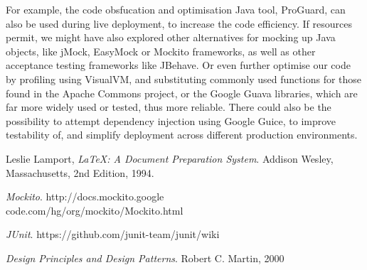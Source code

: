 \documentclass[11pt,twocolumn]{article} %
\begin{document}
For example, the code obsfucation and optimisation Java tool, ProGuard, can also be used
during live deployment, to increase the code efficiency. If resources permit, we might have
also explored other alternatives for mocking up Java objects, like jMock, EasyMock or
Mockito frameworks, as well as other acceptance testing frameworks like JBehave.
Or even further optimise our code by profiling using VisualVM, and substituting commonly
used functions for those found in the Apache Commons project, or the Google Guava
libraries, which are far more widely used or tested, thus more reliable. There could also be
the possibility to attempt dependency injection using Google Guice, to improve testability
of, and simplify deployment across different production environments.


\begin{thebibliography}{9}

  Leslie Lamport,
  \emph{\LaTeX: A Document Preparation System}.
  Addison Wesley, Massachusetts,
  2nd Edition,
  1994.

  \emph{Mockito}.
  http://docs.mockito.google\\code.com/hg/org/mockito/Mockito.html  

  \emph{JUnit}.
  https://github.com/junit-team/junit/wiki

  \emph{Design Principles and Design Patterns}.
  Robert C. Martin,
  2000
  
\end{thebibliography}
\end{document}
